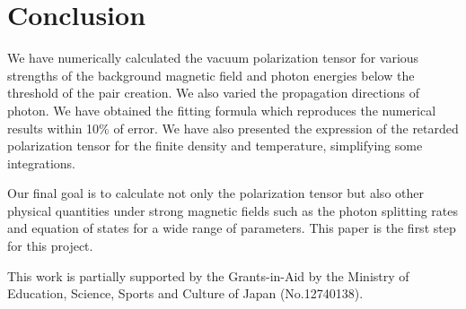 \section{Conclusion}
\label{sec:conclusion}
We have numerically calculated the vacuum polarization tensor for various
strengths of the background magnetic field and photon energies below the
threshold of the pair creation. We also varied the propagation directions of
photon. We have obtained the fitting formula which reproduces the numerical
results within 10\% of error. We have also presented the expression
of the retarded polarization tensor for the finite density and temperature,
simplifying some integrations.

Our final goal is to calculate not only the polarization tensor but also
other physical quantities under strong magnetic fields such as the photon
splitting rates and equation of states for a wide range of parameters. 
This paper is the first step for this project.

\acknowledgments

This work is partially supported by the 
Grants-in-Aid by the Ministry of Education, Science, Sports and 
Culture of Japan (No.12740138).

